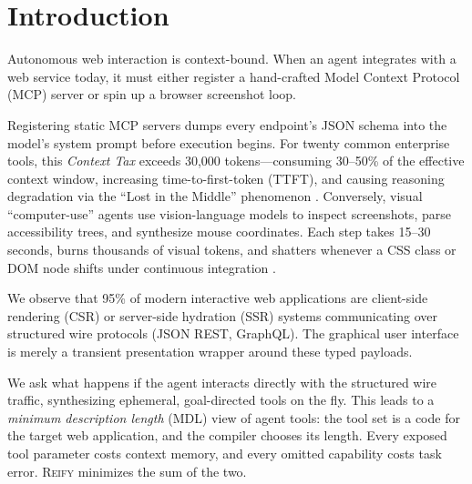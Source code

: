 \documentclass[10pt,twocolumn]{article}
\begin{document}
\section{Introduction}

Autonomous web interaction is context-bound. When an agent integrates with a web service today, it must either register a hand-crafted Model Context Protocol (MCP) server or spin up a browser screenshot loop. 

Registering static MCP servers dumps every endpoint's JSON schema into the model's system prompt before execution begins. For twenty common enterprise tools, this \emph{Context Tax} exceeds 30,000 tokens---consuming 30--50\% of the effective context window, increasing time-to-first-token (TTFT), and causing reasoning degradation via the ``Lost in the Middle'' phenomenon \cite{liu2024lost, rissanen1978modeling}. Conversely, visual ``computer-use'' agents \cite{anthropic2024computeruse} use vision-language models to inspect screenshots, parse accessibility trees, and synthesize mouse coordinates. Each step takes 15--30 seconds, burns thousands of visual tokens, and shatters whenever a CSS class or DOM node shifts under continuous integration \cite{hsieh2024ruler, zhang2024bench}.

We observe that 95\% of modern interactive web applications are client-side rendering (CSR) or server-side hydration (SSR) systems communicating over structured wire protocols (JSON REST, GraphQL). The graphical user interface is merely a transient presentation wrapper around these typed payloads. 

We ask what happens if the agent interacts directly with the structured wire traffic, synthesizing ephemeral, goal-directed tools on the fly. This leads to a \emph{minimum description length} (MDL) \cite{grunwald2007minimum, rissanen1978modeling} view of agent tools: the tool set is a code for the target web application, and the compiler chooses its length. Every exposed tool parameter costs context memory, and every omitted capability costs task error. \textsc{Reify} minimizes the sum of the two.
\end{document}
